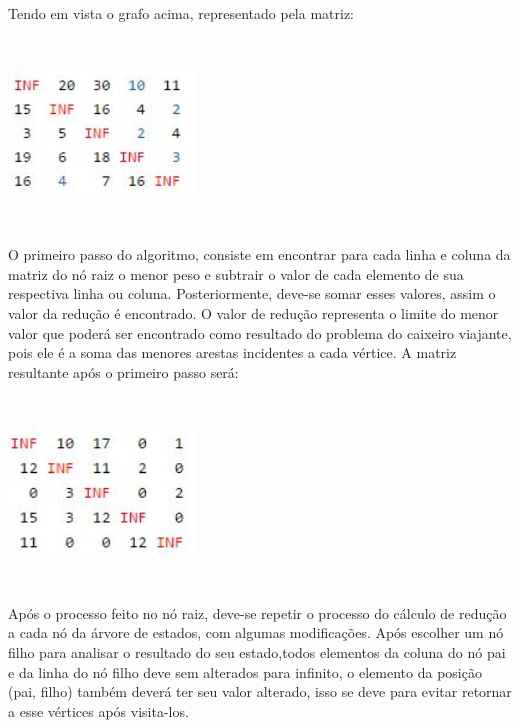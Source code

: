 \documentclass{article}
\begin{document}
\par Tendo em vista o grafo acima, representado pela matriz: 
\begin{center}
\par \includegraphics[width=5cm, height=5cm]{matriz1.jpg} \par
\end{center}

\par O primeiro passo do algoritmo, consiste em encontrar para cada linha e coluna da matriz do nó raiz o menor peso e subtrair o valor de cada elemento de sua respectiva linha ou coluna. Posteriormente, deve-se somar esses valores, assim o valor da redução é encontrado. O valor de redução representa o limite do menor valor que poderá ser encontrado como resultado do problema do caixeiro viajante, pois ele é a soma das menores arestas incidentes a cada vértice. A matriz resultante após o primeiro passo será:

\begin{center}
\par \includegraphics[width=5cm, height=5cm]{matriz2.jpg} \par
\end{center}

Após o processo feito no nó raiz, deve-se repetir o processo do cálculo de redução a cada nó da árvore de estados, com algumas modificações. Após escolher um nó filho para analisar o resultado do seu estado,todos elementos da coluna do nó pai e da linha do nó filho deve sem alterados para infinito, o elemento da posição (pai, filho) também deverá ter seu valor alterado, isso se deve para evitar retornar a esse vértices após visita-los.
\end{document}
